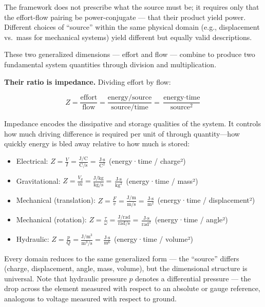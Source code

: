 \documentclass[
  letterpaper,
  DIV=11,
  numbers=noendperiod]{scrartcl}
\providecommand{\tightlist}{%
  \setlength{\itemsep}{0pt}\setlength{\parskip}{0pt}}
\begin{document}
The framework does not prescribe what the source must be; it requires
only that the effort-flow pairing be power-conjugate --- that their
product yield power. Different choices of ``source'' within the same
physical domain (e.g., displacement vs.~mass for mechanical systems)
yield different but equally valid descriptions.

These two generalized dimensions --- effort and flow --- combine to
produce two fundamental system quantities through division and
multiplication.

\textbf{Their ratio is impedance.} Dividing effort by flow:

\[Z = \frac{\text{effort}}{\text{flow}} = \frac{\text{energy}/\text{source}}{\text{source}/\text{time}} = \frac{\text{energy} \cdot \text{time}}{\text{source}^2}\]

Impedance encodes the dissipative and storage qualities of the system.
It controls how much driving difference is required per unit of through
quantity---how quickly energy is bled away relative to how much is
stored:

\begin{itemize}
\tightlist
\item
  Electrical:
  \(Z = \frac{V}{I} = \frac{\text{J/C}}{\text{C/s}} = \frac{\text{J} \cdot \text{s}}{\text{C}^2}\)
  (energy·time / charge²)
\item
  Gravitational:
  \(Z = \frac{V_g}{\dot{m}} = \frac{\text{J/kg}}{\text{kg/s}} = \frac{\text{J} \cdot \text{s}}{\text{kg}^2}\)
  (energy·time / mass²)
\item
  Mechanical (translation):
  \(Z = \frac{F}{v} = \frac{\text{J/m}}{\text{m/s}} = \frac{\text{J} \cdot \text{s}}{\text{m}^2}\)
  (energy·time / displacement²)
\item
  Mechanical (rotation):
  \(Z = \frac{\tau}{\omega} = \frac{\text{J/rad}}{\text{rad/s}} = \frac{\text{J} \cdot \text{s}}{\text{rad}^2}\)
  (energy·time / angle²)
\item
  Hydraulic:
  \(Z = \frac{p}{Q} = \frac{\text{J}/\text{m}^3}{\text{m}^3\text{/s}} = \frac{\text{J} \cdot \text{s}}{\text{m}^6}\)
  (energy·time / volume²)
\end{itemize}

Every domain reduces to the same generalized form --- the ``source''
differs (charge, displacement, angle, mass, volume), but the dimensional
structure is universal. Note that hydraulic pressure \(p\) denotes a
differential pressure --- the drop across the element measured with
respect to an absolute or gauge reference, analogous to voltage measured
with respect to ground.
\end{document}
